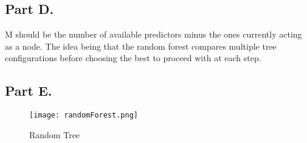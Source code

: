 \documentclass{article}
\begin{document}
\clearpage

\subsection*{Part D.}
M should be the number of available predictors minus the ones currently acting as a node. The idea being that the random forest compares multiple tree configurations before choosing the best to proceed with at each step.

\subsection*{Part E.}
\begin{figure}[hbt!]
\centering
\texttt{[image: randomForest.png]}
\caption{Random Tree}
\end{figure}
\end{document}
